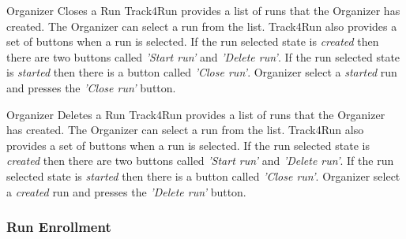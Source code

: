 \documentclass[a4paper]{article}
\begin{document}
        \begin{usecase}{Organizer Closes a Run}
              {Track4Run provides a list of runs that the Organizer has created. The Organizer can select a run from the list. Track4Run also provides a set of buttons when a run is selected. If the run selected state is \textit{created} then there are two buttons called \textit{'Start run'} and \textit{'Delete run'}. If the run selected state is \textit{started} then there is a button called \textit{'Close run'}.}
              {Organizer select a \textit{started} run and presses the \textit{'Close run'} button.}
        \end{usecase}
        
        \begin{usecase}{Organizer Deletes a Run}
              {Track4Run provides a list of runs that the Organizer has created. The Organizer can select a run from the list. Track4Run also provides a set of buttons when a run is selected. If the run selected state is \textit{created} then there are two buttons called \textit{'Start run'} and \textit{'Delete run'}. If the run selected state is \textit{started} then there is a button called \textit{'Close run'}.}
              {Organizer select a \textit{created} run and presses the \textit{'Delete run'} button.}
        \end{usecase}
        
        \subsubsection{Run Enrollment}
        
\end{document}
